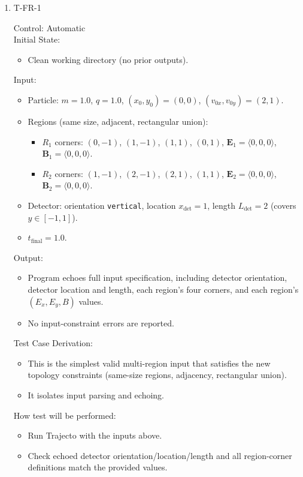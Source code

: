 \documentclass[12pt, titlepage]{article}
\begin{document}
\begin{enumerate}

\item{T-FR-1\\}

Control: Automatic\\

Initial State:
\begin{itemize}
  \item Clean working directory (no prior outputs).
\end{itemize}

Input:
\begin{itemize}
  \item Particle: $m = 1.0$, $q = 1.0$, $(x_0,y_0)=(0,0)$, $(v_{0x},v_{0y})=(2,1)$.
  \item Regions (same size, adjacent, rectangular union):
  \begin{itemize}
    \item $R_1$ corners: $(0,-1)$, $(1,-1)$, $(1,1)$, $(0,1)$,
    $\mathbf{E}_1=\langle 0,0,0\rangle$, $\mathbf{B}_1=\langle 0,0,0\rangle$.
    \item $R_2$ corners: $(1,-1)$, $(2,-1)$, $(2,1)$, $(1,1)$,
    $\mathbf{E}_2=\langle 0,0,0\rangle$, $\mathbf{B}_2=\langle 0,0,0\rangle$.
  \end{itemize}
  \item Detector: orientation \texttt{vertical}, location $x_{\mathrm{det}}=1$,
  length $L_{\mathrm{det}}=2$ (covers $y\in[-1,1]$).
  \item $t_{\text{final}}=1.0$.
\end{itemize}

Output:
\begin{itemize}
  \item Program echoes full input specification, including detector orientation,
  detector location and length, each region's four corners, and each region's
  $(E_x,E_y,B)$ values.
  \item No input-constraint errors are reported.
\end{itemize}

Test Case Derivation:
\begin{itemize}
  \item This is the simplest valid multi-region input that satisfies the new
  topology constraints (same-size regions, adjacency, rectangular union).
  \item It isolates input parsing and echoing.
\end{itemize}

How test will be performed:
\begin{itemize}
  \item Run Trajecto with the inputs above.
  \item Check echoed detector orientation/location/length and all region-corner
  definitions match the provided values.
\end{itemize}

\end{enumerate}
\end{document}
